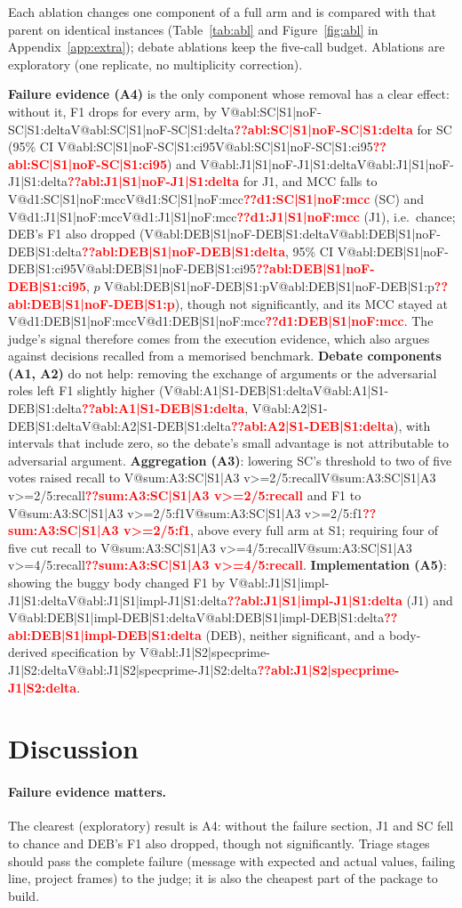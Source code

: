 \documentclass[pdflatex,iicol,sn-mathphys-num]{sn-jnl}
\makeatletter
\newcommand{\V}[1]{\ifcsname V@#1\endcsname\csname V@#1\endcsname\else\textbf{\textcolor{red}{??#1}}\fi}
\makeatother
\begin{document}
Each ablation changes one component of a full arm and is compared with that parent on identical instances (Table~\ref{tab:abl} and Figure~\ref{fig:abl} in Appendix~\ref{app:extra}); debate ablations keep the five-call budget. Ablations are exploratory (one replicate, no multiplicity correction).



\textbf{Failure evidence (A4)} is the only component whose removal has a clear effect: without it, F1 drops for every arm, by \V{abl:SC|S1|noF-SC|S1:delta} for SC (95\% CI \V{abl:SC|S1|noF-SC|S1:ci95}) and \V{abl:J1|S1|noF-J1|S1:delta} for J1, and MCC falls to \V{d1:SC|S1|noF:mcc} (SC) and \V{d1:J1|S1|noF:mcc} (J1), i.e.\ chance; DEB's F1 also dropped (\V{abl:DEB|S1|noF-DEB|S1:delta}, 95\% CI \V{abl:DEB|S1|noF-DEB|S1:ci95}, $p$ \V{abl:DEB|S1|noF-DEB|S1:p}), though not significantly, and its MCC stayed at \V{d1:DEB|S1|noF:mcc}. The judge's signal therefore comes from the execution evidence, which also argues against decisions recalled from a memorised benchmark. \textbf{Debate components (A1, A2)} do not help: removing the exchange of arguments or the adversarial roles left F1 slightly higher (\V{abl:A1|S1-DEB|S1:delta}, \V{abl:A2|S1-DEB|S1:delta}), with intervals that include zero, so the debate's small advantage is not attributable to adversarial argument. \textbf{Aggregation (A3)}: lowering SC's threshold to two of five votes raised recall to \V{sum:A3:SC|S1|A3 v>=2/5:recall} and F1 to \V{sum:A3:SC|S1|A3 v>=2/5:f1}, above every full arm at S1; requiring four of five cut recall to \V{sum:A3:SC|S1|A3 v>=4/5:recall}. \textbf{Implementation (A5)}: showing the buggy body changed F1 by \V{abl:J1|S1|impl-J1|S1:delta} (J1) and \V{abl:DEB|S1|impl-DEB|S1:delta} (DEB), neither significant, and a body-derived specification by \V{abl:J1|S2|specprime-J1|S2:delta}.

\section{Discussion}\label{sec:discussion}

\paragraph{Failure evidence matters.} The clearest (exploratory) result is A4: without the failure section, J1 and SC fell to chance and DEB's F1 also dropped, though not significantly. Triage stages should pass the complete failure (message with expected and actual values, failing line, project frames) to the judge; it is also the cheapest part of the package to build.
\end{document}
